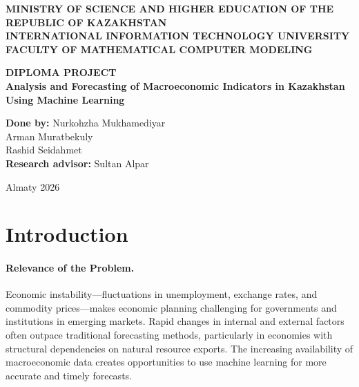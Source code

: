\documentclass[14pt, a4paper]{extarticle}
\begin{document}
\begin{titlepage}
    \begin{center}
        \textbf{MINISTRY OF SCIENCE AND HIGHER EDUCATION OF THE REPUBLIC OF KAZAKHSTAN} \\
        \vspace{0.5cm}
        \textbf{INTERNATIONAL INFORMATION TECHNOLOGY UNIVERSITY} \\
        \vspace{0.5cm}
        \textbf{FACULTY OF MATHEMATICAL COMPUTER MODELING} \\

        \vspace{4cm}

        {\Large \textbf{DIPLOMA PROJECT}} \\
        \vspace{1cm}
        {\large \textbf{Analysis and Forecasting of Macroeconomic Indicators in Kazakhstan Using Machine Learning}} \\

        \vspace{4cm}

        \begin{flushright}
            \textbf{Done by:} Nurkohzha Mukhamediyar \\
            Arman Muratbekuly \\
            Rashid Seidahmet \\
            \vspace{0.5cm}
            \textbf{Research advisor:} Sultan Alpar \\
        \end{flushright}

        \vfill

        Almaty 2026
    \end{center}
\end{titlepage}

\newpage
\tableofcontents
\newpage

\section{Introduction}

\paragraph{Relevance of the Problem.}
Economic instability---fluctuations in unemployment, exchange rates, and commodity prices---makes economic planning challenging for governments and institutions in emerging markets. Rapid changes in internal and external factors often outpace traditional forecasting methods, particularly in economies with structural dependencies on natural resource exports. The increasing availability of macroeconomic data creates opportunities to use machine learning for more accurate and timely forecasts.
\end{document}
